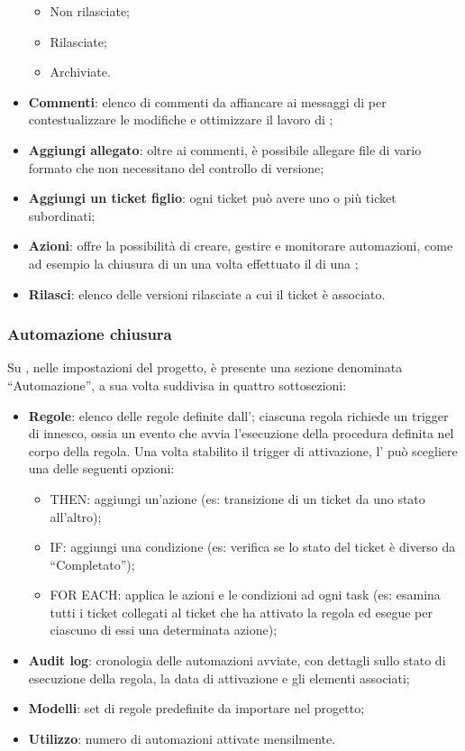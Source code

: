 \begin{itemize}
    \begin{itemize}
      \item Non rilasciate;
      \item Rilasciate;
      \item Archiviate.
    \end{itemize}
  \item \textbf{Commenti}: elenco di commenti da affiancare ai messaggi di  per contestualizzare le modifiche e ottimizzare il lavoro di ;
  \item \textbf{Aggiungi allegato}: oltre ai commenti, è possibile allegare file di vario formato che non necessitano del controllo di versione;
  \item \textbf{Aggiungi un ticket figlio}: ogni ticket può avere uno o più ticket subordinati;
  \item \textbf{Azioni}:  offre la possibilità di creare, gestire e monitorare automazioni, come ad esempio la chiusura di un  una volta effettuato il  di una ;
  \item \textbf{Rilasci}: elenco delle versioni rilasciate a cui il ticket è associato.
\end{itemize}

\subsubsection{Automazione chiusura }
\par Su , nelle impostazioni del progetto, è presente una sezione denominata “Automazione”, a sua volta suddivisa in quattro sottosezioni:
\begin{itemize}
  \item \textbf{Regole}: elenco delle regole definite dall'\Amministratore{}; ciascuna regola richiede un trigger di innesco, ossia un evento che avvia l'esecuzione della procedura definita nel corpo della regola. Una volta stabilito il trigger di attivazione, l’\Amministratore{} può scegliere una delle seguenti opzioni:
  \begin{itemize}
    \item THEN: aggiungi un'azione (es: transizione di un ticket da uno stato all'altro);
    \item IF: aggiungi una condizione (es: verifica se lo stato del ticket è diverso da “Completato”);
    \item FOR EACH: applica le azioni e le condizioni ad ogni task (es: esamina tutti i ticket collegati al ticket che ha attivato la regola ed esegue per ciascuno di essi una determinata azione);
  \end{itemize}
  \item \textbf{Audit log}: cronologia delle automazioni avviate, con dettagli sullo stato di esecuzione della regola, la data di attivazione e gli elementi associati;
  \item \textbf{Modelli}: set di regole predefinite da importare nel progetto;
  \item \textbf{Utilizzo}: numero di automazioni attivate mensilmente.
\end{itemize}

